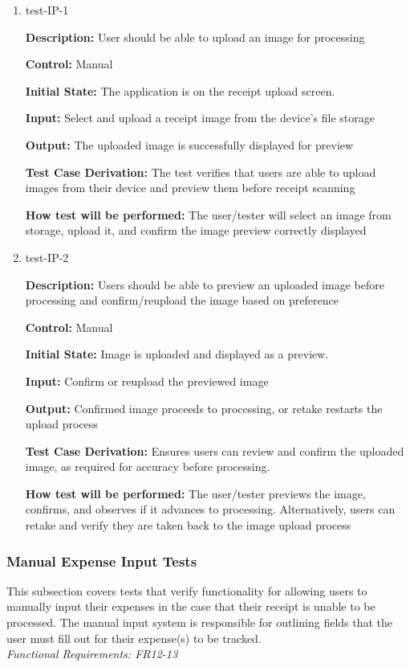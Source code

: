 \documentclass[12pt, titlepage]{article}
\begin{document}
\begin{enumerate}
\item{test-IP-1\\}

\textbf{Description:} User should be able to upload an image for processing

\textbf{Control:} Manual

\textbf{Initial State:} The application is on the receipt upload screen.

\textbf{Input:} Select and upload a receipt image from the device's file storage

\textbf{Output:} The uploaded image is successfully displayed for preview

\textbf{Test Case Derivation:} The test verifies that users are able to upload images from their device and preview them before receipt scanning

\textbf{How test will be performed:} The user/tester will select an image from storage, upload it, and confirm the image preview correctly displayed

\item{test-IP-2\\}

\textbf{Description:} Users should be able to preview an uploaded image before processing and confirm/reupload the image based on preference

\textbf{Control:} Manual

\textbf{Initial State:} Image is uploaded and displayed as a preview.

\textbf{Input:} Confirm or reupload the previewed image

\textbf{Output:} Confirmed image proceeds to processing, or retake restarts the upload process

\textbf{Test Case Derivation:} Ensures users can review and confirm the uploaded image, as required for accuracy before processing.

\textbf{How test will be performed:} The user/tester previews the image, confirms, and observes if it advances to processing. Alternatively, users can retake and verify they are taken back to the image upload process
\end{enumerate}

\subsubsection{Manual Expense Input Tests}

This subsection covers tests that verify functionality for allowing users to manually input their expenses in the case that their receipt is unable to be processed. 
The manual input system is responsible for outlining fields that the user must fill out for their expense(s) to be tracked.\\
\textit{Functional Requirements: FR12-13}
\end{document}

